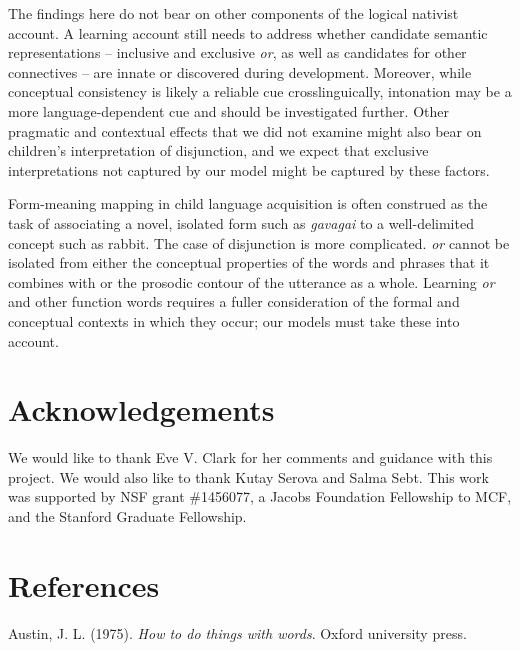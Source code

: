 \documentclass[10pt, letterpaper]{article}
\begin{document}
The findings here do not bear on other components of the logical
nativist account. A learning account still needs to address whether
candidate semantic representations -- inclusive and exclusive \emph{or},
as well as candidates for other connectives -- are innate or discovered
during development. Moreover, while conceptual consistency is likely a
reliable cue crosslinguically, intonation may be a more
language-dependent cue and should be investigated further. Other
pragmatic and contextual effects that we did not examine might also bear
on children's interpretation of disjunction, and we expect that
exclusive interpretations not captured by our model might be captured by
these factors.

Form-meaning mapping in child language acquisition is often construed as
the task of associating a novel, isolated form such as \emph{gavagai} to
a well-delimited concept such as rabbit. The case of disjunction is more
complicated. \emph{or} cannot be isolated from either the conceptual
properties of the words and phrases that it combines with or the
prosodic contour of the utterance as a whole. Learning \emph{or} and
other function words requires a fuller consideration of the formal and
conceptual contexts in which they occur; our models must take these into
account.

\vspace{1em}
\vspace{1em}

\section{Acknowledgements}\label{acknowledgements}

We would like to thank Eve V. Clark for her comments and guidance with
this project. We would also like to thank Kutay Serova and Salma Sebt.
This work was supported by NSF grant \#1456077, a Jacobs Foundation
Fellowship to MCF, and the Stanford Graduate Fellowship.

\section{References}\label{references}

\setlength{\parindent}{-0.1in} \setlength{\leftskip}{0.125in} \noindent

\hypertarget{refs}{}
\hypertarget{ref-austin1975things}{}
Austin, J. L. (1975). \emph{How to do things with words}. Oxford
university press.
\end{document}
